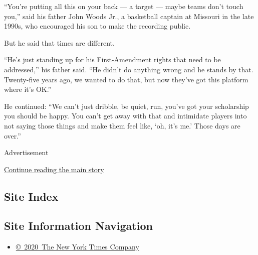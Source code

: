 ``You're putting all this on your back --- a target --- maybe teams
don't touch you,'' said his father John Woods Jr., a basketball captain
at Missouri in the late 1990s, who encouraged his son to make the
recording public.

But he said that times are different.

``He's just standing up for his First-Amendment rights that need to be
addressed,'' his father said. ``He didn't do anything wrong and he
stands by that. Twenty-five years ago, we wanted to do that, but now
they've got this platform where it's OK.''

He continued: ``We can't just dribble, be quiet, run, you've got your
scholarship you should be happy. You can't get away with that and
intimidate players into not saying those things and make them feel like,
`oh, it's me.' Those days are over.''

Advertisement

\protect\hyperlink{after-bottom}{Continue reading the main story}

\hypertarget{site-index}{%
\subsection{Site Index}\label{site-index}}

\hypertarget{site-information-navigation}{%
\subsection{Site Information
Navigation}\label{site-information-navigation}}

\begin{itemize}
\tightlist
\item
  \href{https://help.nytimes3xbfgragh.onion/hc/en-us/articles/115014792127-Copyright-notice}{©~2020~The
  New York Times Company}
\end{itemize}

